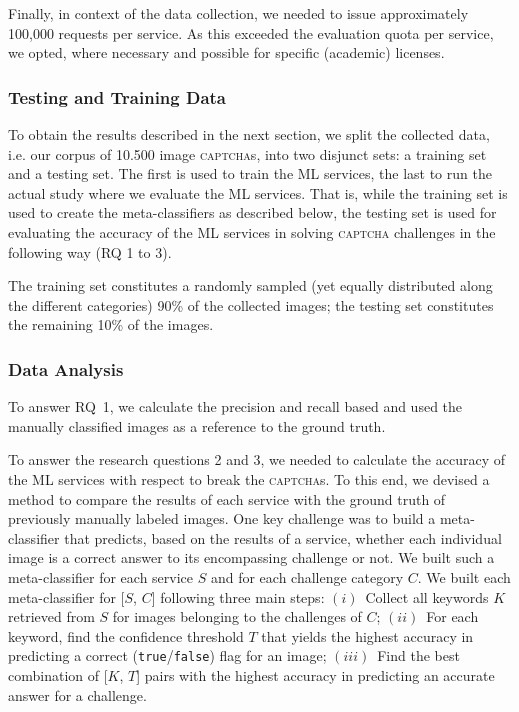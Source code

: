 \documentclass[sigconf,review,anonymous]{acmart}
\newcommand{\captcha}{\textsc{captcha}\xspace}
\newcommand{\captchas}{\textsc{captcha}s\xspace}
\begin{document}
Finally, in context of the data collection, we needed to issue approximately 100,000 requests per service. As this exceeded the evaluation quota per service, we opted, 
where necessary and possible for specific (academic) licenses.

\subsubsection{Testing and Training Data}
\label{sec:TestingAndTraining}

To obtain the results described in the next section, we split the collected data, i.e. our corpus of 10.500 image \captchas, into two disjunct sets: a training set and a testing set. The first is used to train the ML services, the last to run the actual study where we evaluate the ML services. That is, while the training set is used to create the meta-classifiers as described below, the testing set is used for evaluating the accuracy of the ML services in solving \captcha challenges in the following way (RQ 1 to 3). 

The training set constitutes a randomly sampled (yet equally distributed along the different categories) 90\% of the collected images; the testing set constitutes the remaining 10\% of the images.



\subsubsection{Data Analysis}
To answer RQ~1, we calculate the precision and recall based and used the manually classified images as a reference to the ground truth.

To answer the research questions 2 and 3, we needed to calculate the accuracy of the ML services with respect to break the \captchas. To this end, we devised a method to compare the results of each service with the ground truth of previously manually labeled images. One key challenge was to build a meta-classifier that predicts, based on the results of a service, whether each individual image is a correct answer to its encompassing challenge or not. We built such a meta-classifier for each service $S$ and for each challenge category $C$. We built each meta-classifier for [$S$, $C$] following three main steps: $(i)$~Collect all keywords $K$ retrieved from $S$ for images belonging to the challenges of $C$; $(ii)$~For each keyword, find the confidence threshold $T$ that yields the highest accuracy in predicting a correct (\texttt{true}/\texttt{false}) flag for an image; $(iii)$~Find the best combination of [$K$, $T$] pairs with the highest accuracy in predicting an accurate answer for a challenge.
\end{document}
